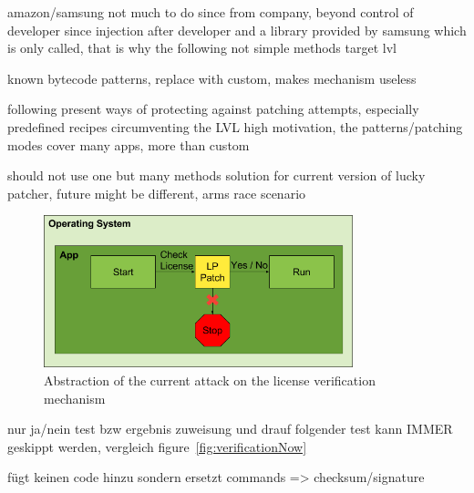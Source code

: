 amazon/samsung not much to do since from company, beyond control of developer since injection after developer and a library provided by samsung which is only called, that is why the following not simple methods target lvl

known bytecode patterns, replace with custom, makes mechanism useless

following present ways of protecting against patching attempts, especially predefined recipes circumventing the LVL
high motivation, the patterns/patching modes cover many apps, more than custom

should not use one but many methods
solution for current version of lucky patcher, future might be different, arms race scenario
\cite{munteanLicense}
%

\begin{figure}[h]
    \centering
    \includegraphics[width=0.8\textwidth]{data/verificationNowAttack.png}
    \caption{Abstraction of the current attack on the license verification mechanism}
    \label{fig:verificationNowAttack}
\end{figure}

nur ja/nein test bzw ergebnis zuweisung und drauf folgender test kann IMMER geskippt werden, vergleich figure~\ref{fig:verificationNow}



fügt keinen code hinzu sondern ersetzt commands => checksum/signature
